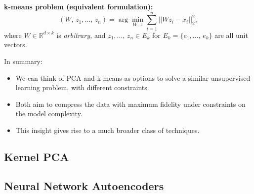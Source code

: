 \documentclass[a4paper]{extarticle}
\begin{document}
\textbf{k-means problem (equivalent formulation):}
\[
    (W, \, z_1,..., \, z_n) = \arg \min_{W, \, z} \sum_{i = 1}^n ||Wz_i - x_i||_2^2,
\]
where $W \in \mathbb{R}^{d \times k}$ is \textit{arbitrary,} and $z_1,..., \, z_n \in E_k$ for $E_k = \{e_1,..., \, e_k\}$ are all unit vectors.

In summary:
\begin{itemize}
    \item We can think of PCA and k-means as options to solve a similar unsupervised learning problem, with different constraints.
    \item Both aim to compress the data with maximum fidelity under constraints on the model complexity.
    \item This insight gives rise to a much broader class of techniques.
\end{itemize}

\subsection{Kernel PCA}

\subsection{Neural Network Autoencoders}
\end{document}
